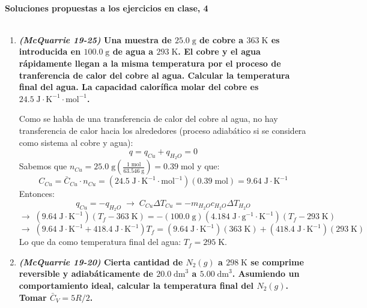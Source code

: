 \documentclass[a4paper,12pt]{article}
\begin{document}

\begin{center}
\HRule \\[0.4cm]
{ \bfseries Soluciones propuestas a los ejercicios en clase, 4}\\ %
\HRule \\[0.4cm]
\end{center}


\begin{enumerate}

 \item \textbf{\textit{(McQuarrie 19-25)} Una muestra de $25.0\;\mbox{g}$ de cobre a $363\;\mbox{K}$ es introducida en $100.0\;\mbox{g}$ de agua a $293\;\mbox{K}$. El cobre y el agua r\'apidamente llegan a la misma temperatura por el proceso de tranferencia de calor del cobre al agua. Calcular la temperatura final del agua. La capacidad calor\'ifica molar del cobre es $24.5\;\mbox{J}\cdot\mbox{K}^{-1}\cdot\mbox{mol}^{-1}$.} %

Como se habla de una transferencia de calor del cobre al agua, no hay transferencia de calor hacia los alrededores (proceso adiab\'atico si se considera como sistema al cobre y agua): 
$$q=q_{Cu}+q_{H_2O}=0$$
Sabemos que $n_{Cu}=25.0\;\mbox{g}\left(\frac{1\;\mbox{mol}}{63.546\;\mbox{g}}\right)=0.39\;\mbox{mol}$ y que: 
$$C_{Cu}=\bar{C}_{Cu}\cdot n_{Cu}=(24.5\;\mbox{J}\cdot\mbox{K}^{-1}\cdot\mbox{mol}^{-1})(0.39\;\mbox{mol})=9.64\;\mbox{J}\cdot\mbox{K}^{-1}$$
Entonces:
$$q_{Cu}=-q_{H_2O}\;\rightarrow\; C_{Cu}\Delta T_{Cu}=-m_{H_2O}c_{H_2O}\Delta T_{H_2O}$$
$$\rightarrow\; (9.64\;\mbox{J}\cdot\mbox{K}^{-1})(T_f-363\;\mbox{K})=-(100.0\;\mbox{g})(4.184\;\mbox{J}\cdot\mbox{g}^{-1}\cdot\mbox{K}^{-1})(T_f-293\;\mbox{K})$$
$$\rightarrow\;(9.64\;\mbox{J}\cdot\mbox{K}^{-1}+418.4\;\mbox{J}\cdot\mbox{K}^{-1})T_f=(9.64\;\mbox{J}\cdot\mbox{K}^{-1})(363\;\mbox{K})+(418.4\;\mbox{J}\cdot\mbox{K}^{-1})(293\;\mbox{K})$$
Lo que da como temperatura final del agua: $T_f=295\;\mbox{K}$.

 \item \textbf{\textit{(McQuarrie 19-20)} Cierta cantidad de $N_2(g)$ a $298\;\mbox{K}$ se comprime reversible y adiab\'aticamente de $20.0\;\mbox{dm}^3$ a $5.00\;\mbox{dm}^3$. Asumiendo un comportamiento ideal, calcular la temperatura final del $N_2(g)$. Tomar $\bar{C}_V=5R/2$.} %


\end{enumerate}
\end{document}
